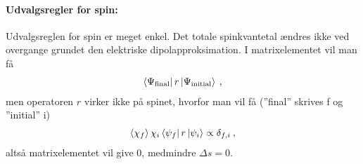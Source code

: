 \paragraph{Udvalgsregler for spin:} Udvalgsreglen for spin er meget enkel. Det totale spinkvantetal ændres ikke ved overgange grundet den elektriske dipolapproksimation. I matrixelementet vil man få
\begin{align}
    \bra{\Psi_\text{final}}r\ket{\Psi_\text{initial}} \: ,
\end{align}
men operatoren $r$ virker ikke på spinet, hvorfor man vil få (''final'' skrives f og ''initial'' i)
\begin{align}
    \Braket{\chi_f}{\chi_i}\bra{\psi_f}r\ket{\psi_i} \propto \delta_{f,i} \: ,
\end{align}
altså matrixelementet vil give 0, medmindre $\Delta s = 0$.
